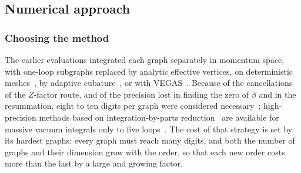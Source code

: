 \subsection{Numerical approach}
\label{sec:methods-numerics}

\subsubsection{Choosing the method}
\label{sec:methods-choice}

The earlier evaluations integrated each graph separately in momentum space, with one-loop subgraphs replaced by
analytic effective vertices, on deterministic meshes~\cite{NMB1977}, by adaptive
cubature~\cite{Ribeca2003thesis,GuidaRibeca2006}, or with VEGAS~\cite{Lepage1978,Phi4tools2024}. Because of the
cancellations of the $Z$-factor route, and of the precision lost in finding the zero of $\beta$ and in the resummation,
eight to ten digits per graph were considered necessary~\cite{Ribeca2003thesis}; high-precision
methods based on integration-by-parts reduction~\cite{ChetyrkinTkachov1981,Laporta2000} are available for massive vacuum integrals only to five
loops~\cite{LutheSchroeder2016}. The cost of that strategy is set by its hardest graphs: every graph must reach many
digits, and both the number of graphs and their dimension grow with the order, so that each new order costs more than
the last by a large and growing factor.

